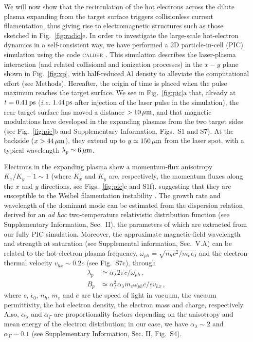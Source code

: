 \documentclass[aps,twocolumn,showpacs,superscriptaddress]{revtex4}
\begin{document}
We will now show that the recirculation of the hot electrons across the dilute plasma expanding from the target surface triggers collisionless current filamentation, thus giving rise to electromagnetic structures such as those sketched in Fig.~\ref{fig:radio}e. In order to investigate the large-scale hot-electron dynamics in a self-consistent way, we have performed a 2D particle-in-cell (PIC) simulation using the code \textsc{calder} \cite{NF_Lefebvre_2003}. This simulation describes the laser-plasma interaction (and related collisional and ionization processes) in the $x-y$ plane shown in Fig.~\ref{fig:xp}, with half-reduced Al density to alleviate the computational effort (see Methods). Hereafter, the origin of time is placed when the pulse maximum reaches the target surface. We see in Fig.~\ref{fig:pic}a that, already at $t=0.41\, \rm ps$ (\emph{i.e.} $1.44\,\rm ps$ after injection of the laser pulse in the simulation), the rear target surface has moved a distance $>10\,\rm \mu m$, and that magnetic modulations have developed in the expanding plasmas from the two target sides (see Fig.~\ref{fig:pic}b and Supplementary Information, Figs.~S1 and S7). At the backside ($x>44\,\rm \mu m$), they extend up to $y \simeq 150\,\rm \mu m$ from the laser spot, with a typical wavelength $\lambda_p \simeq 6\,\rm \mu m$.

Electrons in the expanding plasma show a momentum-flux anisotropy $K_x/K_y - 1 \sim 1$ (where $K_x$ and $K_y$ are, respectively, the momentum fluxes along the $x$ and $y$ directions, see Figs.~\ref{fig:pic}c and S1f), suggesting that they are susceptible to the Weibel filamentation instability \cite{POP_Ren_2006, PRL_Gode_2017}. The growth rate and wavelength of the dominant mode can be estimated from the dispersion relation derived for an \emph{ad hoc} two-temperature relativistic distribution function
(see Supplementary Information, Sec.~II), the parameters of which are extracted from our fully PIC simulation. Moreover, the approximate magnetic-field wavelength and strength at saturation (see Supplemental information, Sec.~V.A) can be related to the hot-electron plasma frequency, $\omega_{ph}=\sqrt{n_h e^2/m_e \epsilon_0}$ and the electron thermal velocity $v_{hx}\sim 0.2c$ (see Fig.~S7c), through 
\begin{align}
  \lambda_p &\simeq \alpha_\lambda 2\pi c/\omega_{ph} \label{eq:lp}  \,,\\
  B_p &\simeq \alpha_\Gamma^2\alpha_\lambda m_e \omega_{ph}c/ ev_{hx} \label{eq:bp} \,, 
\end{align}
where $c$, $\epsilon_0$, $n_h$, $m_e$ and $e$ are the speed of light in vacuum, the vacuum permittivity, the hot electron density, the electron mass and charge, respectively. Also, $\alpha_\lambda $ and $\alpha_\Gamma $ are proportionality factors depending on the anisotropy and mean energy of the electron distribution; in our case, we have $\alpha_\lambda \sim 2$ and $\alpha_\Gamma\sim 0.1$ (see Supplementary Information, Sec. II, Fig.~S4).
\end{document}
